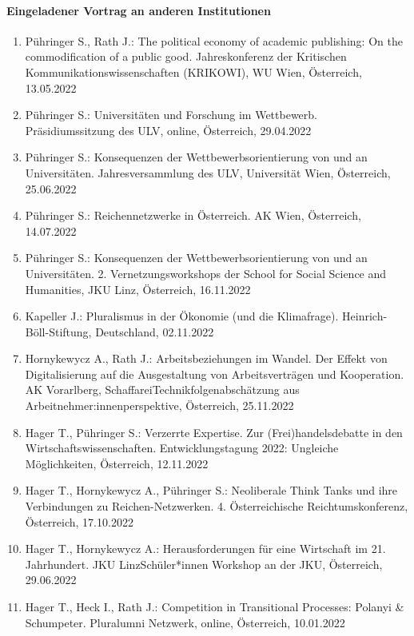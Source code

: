 \paragraph{Eingeladener Vortrag an anderen Institutionen}
\begin{enumerate}
	\item Pühringer S., Rath J.: The political economy of academic publishing: On the commodification of a public good. Jahreskonferenz der Kritischen Kommunikationswissenschaften (KRIKOWI), WU Wien, Österreich, 13.05.2022
	\item Pühringer S.: Universitäten und Forschung im Wettbewerb. Präsidiumssitzung des ULV, online, Österreich, 29.04.2022
	\item Pühringer S.: Konsequenzen der Wettbewerbsorientierung von und an Universitäten. Jahresversammlung des ULV, Universität Wien, Österreich, 25.06.2022
	\item Pühringer S.: Reichennetzwerke in Österreich. AK Wien, Österreich, 14.07.2022
	\item Pühringer S.: Konsequenzen der Wettbewerbsorientierung von und an Universitäten. 2. Vernetzungsworkshops der School for Social Science and Humanities, JKU Linz, Österreich, 16.11.2022
	\item Kapeller J.: Pluralismus in der Ökonomie (und die Klimafrage). Heinrich-Böll-Stiftung, Deutschland, 02.11.2022
	\item Hornykewycz A., Rath J.: Arbeitsbeziehungen im Wandel. Der Effekt von Digitalisierung auf die Ausgestaltung von Arbeitsverträgen und Kooperation. AK Vorarlberg, SchaffareiTechnikfolgenabschätzung aus Arbeitnehmer:innenperspektive, Österreich, 25.11.2022
	\item Hager T., Pühringer S.: Verzerrte Expertise. Zur (Frei)handelsdebatte in den Wirtschaftswissenschaften. Entwicklungstagung 2022: Ungleiche Möglichkeiten, Österreich, 12.11.2022
	\item Hager T., Hornykewycz A., Pühringer S.: Neoliberale Think Tanks und ihre Verbindungen zu Reichen-Netzwerken. 4. Österreichische Reichtumskonferenz, Österreich, 17.10.2022
	\item Hager T., Hornykewycz A.: Herausforderungen für eine Wirtschaft im 21. Jahrhundert. JKU LinzSchüler*innen Workshop an der JKU, Österreich, 29.06.2022
	\item Hager T., Heck I., Rath J.: Competition in Transitional Processes: Polanyi & Schumpeter. Pluralumni Netzwerk, online, Österreich, 10.01.2022
\end{enumerate}
